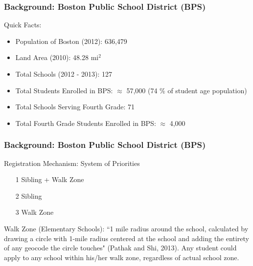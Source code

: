 \documentclass{beamer}
\begin{document}
\begin{frame}
\label{Background: BPS}
\frametitle{Background: Boston Public School District (BPS)}
Quick Facts:
\begin{itemize}
\item Population of Boston (2012): 636,479
\item Land Area (2010): 48.28 mi$^2$
\item Total Schools (2012 - 2013): 127
\item Total Students Enrolled in BPS: $\approx$ 57,000 (74 \% of student age population)
\item Total Schools Serving Fourth Grade: 71
\item Total Fourth Grade Students Enrolled in BPS: $\approx$ 4,000
\end{itemize}
\end{frame}

\begin{frame}
\label{Background: BPS}
\frametitle{Background: Boston Public School District (BPS)}
Registration Mechanism: System of Priorities
\begin{itemize}
\item[1] Sibling + Walk Zone
\item[2] Sibling
\item[3] Walk Zone \newline
\end{itemize}
Walk Zone (Elementary Schools): ``1 mile radius around the school, calculated by drawing a circle with 1-mile radius centered at the school and adding the entirety of any geocode the circle touches" (Pathak and Shi, 2013). 
\newline \newline
Any student could apply to any school within his/her walk zone, regardless of actual school zone. 
\end{frame}
\end{document}
